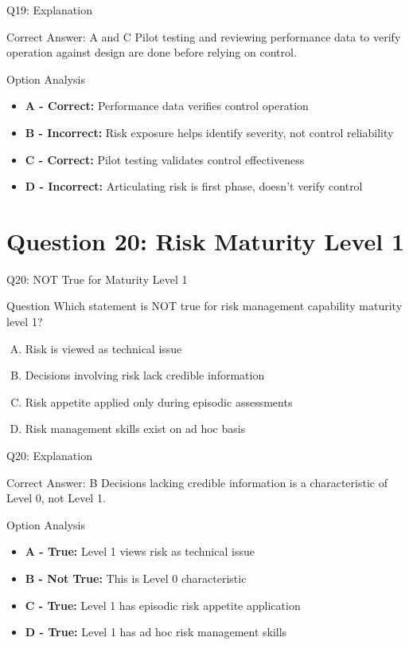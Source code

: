 \documentclass{beamer}
\begin{document}
	\begin{frame}{Q19: Explanation}
		\begin{block}{Correct Answer: A and C}
			Pilot testing and reviewing performance data to verify operation against design are done before relying on control.
		\end{block}
		\begin{block}{Option Analysis}
			\begin{itemize}
				\item \textbf{A - Correct:} Performance data verifies control operation
				\item \textbf{B - Incorrect:} Risk exposure helps identify severity, not control reliability
				\item \textbf{C - Correct:} Pilot testing validates control effectiveness
				\item \textbf{D - Incorrect:} Articulating risk is first phase, doesn't verify control
			\end{itemize}
		\end{block}
	\end{frame}
	
	\section{Question 20: Risk Maturity Level 1}
	
	\begin{frame}{Q20: NOT True for Maturity Level 1}
		\begin{block}{Question}
			Which statement is NOT true for risk management capability maturity level 1?
		\end{block}
		\begin{enumerate}[(A)]
			\item Risk is viewed as technical issue
			\item Decisions involving risk lack credible information
			\item Risk appetite applied only during episodic assessments
			\item Risk management skills exist on ad hoc basis
		\end{enumerate}
	\end{frame}
	
	\begin{frame}{Q20: Explanation}
		\begin{block}{Correct Answer: B}
			Decisions lacking credible information is a characteristic of Level 0, not Level 1.
		\end{block}
		\begin{block}{Option Analysis}
			\begin{itemize}
				\item \textbf{A - True:} Level 1 views risk as technical issue
				\item \textbf{B - Not True:} This is Level 0 characteristic
				\item \textbf{C - True:} Level 1 has episodic risk appetite application
				\item \textbf{D - True:} Level 1 has ad hoc risk management skills
			\end{itemize}
		\end{block}
	\end{frame}
	
\end{document}

